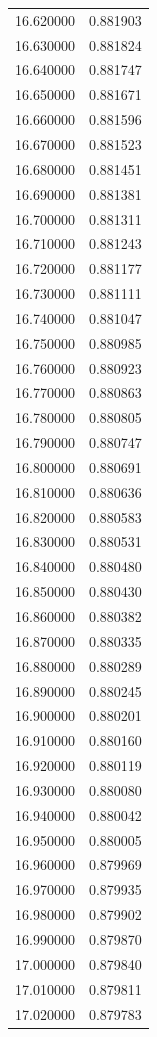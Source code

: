 \begin{tabular}{rr}
16.620000 & 0.881903 \\
16.630000 & 0.881824 \\
16.640000 & 0.881747 \\
16.650000 & 0.881671 \\
16.660000 & 0.881596 \\
16.670000 & 0.881523 \\
16.680000 & 0.881451 \\
16.690000 & 0.881381 \\
16.700000 & 0.881311 \\
16.710000 & 0.881243 \\
16.720000 & 0.881177 \\
16.730000 & 0.881111 \\
16.740000 & 0.881047 \\
16.750000 & 0.880985 \\
16.760000 & 0.880923 \\
16.770000 & 0.880863 \\
16.780000 & 0.880805 \\
16.790000 & 0.880747 \\
16.800000 & 0.880691 \\
16.810000 & 0.880636 \\
16.820000 & 0.880583 \\
16.830000 & 0.880531 \\
16.840000 & 0.880480 \\
16.850000 & 0.880430 \\
16.860000 & 0.880382 \\
16.870000 & 0.880335 \\
16.880000 & 0.880289 \\
16.890000 & 0.880245 \\
16.900000 & 0.880201 \\
16.910000 & 0.880160 \\
16.920000 & 0.880119 \\
16.930000 & 0.880080 \\
16.940000 & 0.880042 \\
16.950000 & 0.880005 \\
16.960000 & 0.879969 \\
16.970000 & 0.879935 \\
16.980000 & 0.879902 \\
16.990000 & 0.879870 \\
17.000000 & 0.879840 \\
17.010000 & 0.879811 \\
17.020000 & 0.879783 \\

\end{tabular}
